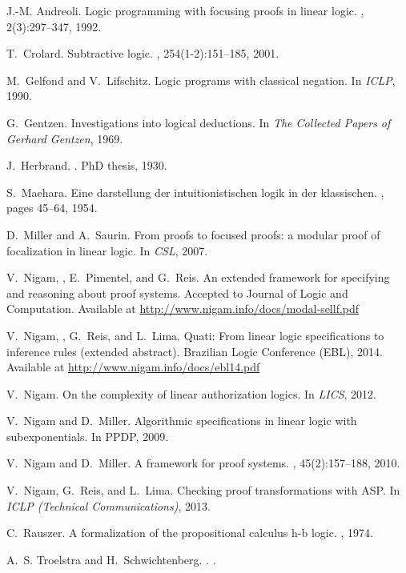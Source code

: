 \documentclass{llncs}
\begin{document}

% 
\begin{thebibliography}{10}

J.-M. Andreoli.
\newblock Logic programming with focusing proofs in linear logic.
, 2(3):297--347, 1992.

T.~Crolard.
\newblock Subtractive logic.
, 254(1-2):151--185, 2001.

M.~Gelfond and V.~Lifschitz.
\newblock Logic programs with classical negation.
\newblock In {\em ICLP}, 1990.

G.~Gentzen.
\newblock Investigations into logical deductions.
\newblock In {\em {The Collected Papers of Gerhard
  Gentzen}}, 1969.

J.~Herbrand.
.
\newblock PhD thesis, 1930.

S.~Maehara.
\newblock Eine darstellung der intuitionistischen logik in der klassischen.
, pages 45--64, 1954.

D.~Miller and A.~Saurin.
\newblock From proofs to focused proofs: a modular proof of focalization in
  linear logic.
\newblock In {\em CSL}, 2007.

V.~Nigam, , E.~Pimentel, and G.~Reis.
\newblock An extended framework for specifying and reasoning about proof
  systems.
\newblock Accepted to Journal of Logic and Computation. Available at 
\url{http://www.nigam.info/docs/modal-sellf.pdf}

V.~Nigam, , G.~Reis, and L.~Lima.
\newblock Quati: From linear logic specifications to inference rules (extended
  abstract).
\newblock Brazilian Logic Conference (EBL), 2014. Available at
\url{http://www.nigam.info/docs/ebl14.pdf}

V.~Nigam.
\newblock On the complexity of linear authorization logics.
\newblock In {\em LICS}, 2012.

V.~Nigam and D.~Miller.
\newblock Algorithmic specifications in linear logic with subexponentials.
\newblock In PPDP, 2009.

V.~Nigam and D.~Miller.
\newblock A framework for proof systems.
, 45(2):157--188, 2010.

V.~Nigam, G.~Reis, and L.~Lima.
\newblock Checking proof transformations with {ASP}.
\newblock In {\em ICLP (Technical Communications)}, 2013.

C.~Rauszer.
\newblock A formalization of the propositional calculus h-b logic.
, 1974.

A.~S. Troelstra and H.~Schwichtenberg.
.
.

\end{thebibliography}
\end{document}
